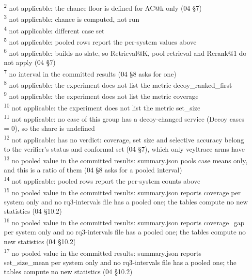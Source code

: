 \begin{table}[t]
\textsuperscript{2} not applicable: the chance floor is defined for AC@k only (04 \S{}7)\\
\textsuperscript{3} not applicable: chance is computed, not run\\
\textsuperscript{4} not applicable: different case set\\
\textsuperscript{5} not applicable: pooled rows report the per-system values above\\
\textsuperscript{6} not applicable: builds no slate, so Retrieval@K, pool retrieval and Rerank@1 do not apply (04 \S{}7)\\
\textsuperscript{7} no interval in the committed results (04 \S{}8 asks for one)\\
\textsuperscript{8} not applicable: the experiment does not list the metric decoy\_ranked\_first\\
\textsuperscript{9} not applicable: the experiment does not list the metric coverage\\
\textsuperscript{10} not applicable: the experiment does not list the metric set\_size\\
\textsuperscript{11} not applicable: no case of this group has a decoy-changed service (Decoy cases = 0), so the share is undefined\\
\textsuperscript{12} not applicable: has no verdict: coverage, set size and selective accuracy belong to the verifier's status and conformal set (04 \S{}7), which only veyltrace arms have\\
\textsuperscript{13} no pooled value in the committed results: summary.json pools case means only, and this is a ratio of them (04 \S{}8 asks for a pooled interval)\\
\textsuperscript{14} not applicable: pooled rows report the per-system counts above\\
\textsuperscript{15} no pooled value in the committed results: summary.json reports coverage per system only and no rq3-intervals file has a pooled one; the tables compute no new statistics (04 \S{}10.2)\\
\textsuperscript{16} no pooled value in the committed results: summary.json reports coverage\_gap per system only and no rq3-intervals file has a pooled one; the tables compute no new statistics (04 \S{}10.2)\\
\textsuperscript{17} no pooled value in the committed results: summary.json reports set\_size\_mean per system only and no rq3-intervals file has a pooled one; the tables compute no new statistics (04 \S{}10.2)\\

\end{table}
